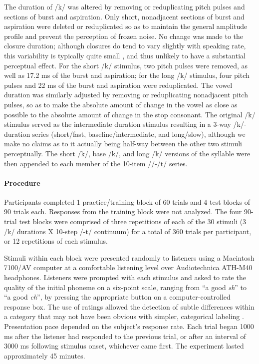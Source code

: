The duration of /k/ was altered by removing or reduplicating pitch pulses and sections of burst and aspiration. Only short, nonadjacent sections of burst and aspiration were deleted or reduplicated so as to maintain the general amplitude profile and prevent the perception of frozen noise. No change was made to the closure duration; although closures do tend to vary slightly with speaking rate, this variability is typically quite small \citep{crystalSegmentalDurationsConnected1988,gayEffectSpeakingRate1978}, and thus unlikely to have a substantial perceptual effect. For the short /k/ stimulus, two pitch pulses were removed, as well as 17.2 ms of the burst and aspiration; for the long /k/ stimulus, four pitch pulses and 22 ms of the burst and aspiration were reduplicated. The vowel duration was similarly adjusted by removing or reduplicating nonadjacent pitch pulses, so as to make the absolute amount of change in the vowel as close as possible to the absolute amount of change in the stop consonant. The original /k/ stimulus served as the intermediate duration stimulus resulting in a 3-way /k/-duration series (short/fast, baseline/intermediate, and long/slow), although we make no claims as to it actually being half-way between the other two stimuli perceptually. The short /k/, base /k/, and long /k/ versions of the syllable were then appended to each member of the 10-item /\textesh/-/t\textesh/ series. 

\paragraph{Procedure}

Participants completed 1 practice/training block of 60 trials and 4 test blocks of 90 trials each. Responses from the training block were not analyzed. The four 90-trial test blocks were comprised of three repetitions of each of the 30 stimuli (3 /k/ durations X 10-step /\textesh-t\textesh/ continuum) for a total of 360 trials per participant, or 12 repetitions of each stimulus. 

Stimuli within each block were presented randomly to listeners using a Macintosh 7100/AV computer at a comfortable listening level over Audiotechnica ATH-M40 headphones. Listeners were prompted with each stimulus and asked to rate the quality of the initial phoneme on a six-point scale, ranging from ``a good \textit{sh}'' to ``a good \textit{ch}'', by pressing the appropriate button on a computer-controlled response box. The use of ratings allowed the detection of subtle differences within a category that may not have been obvious with simpler, categorical labeling \citep{sawuschSelectiveAdaptationEffects1976}. Presentation pace depended on the subject's response rate. Each trial began 1000 ms after the listener had responded to the previous trial, or after an interval of 3000 ms following stimulus onset, whichever came first. The experiment lasted approximately 45 minutes. 

